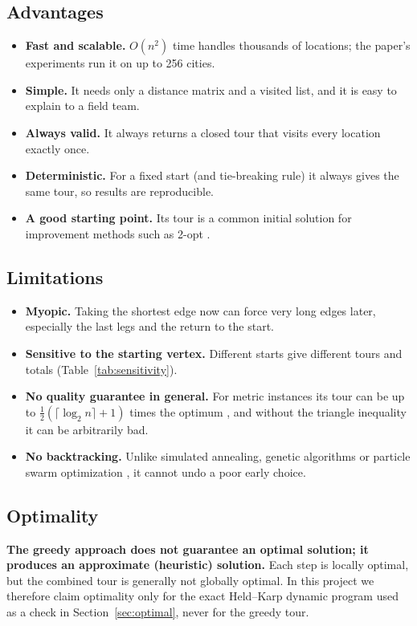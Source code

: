 \documentclass[11pt,a4paper]{article}
\begin{document}
\subsection{Advantages}
\begin{itemize}[noitemsep]
  \item \textbf{Fast and scalable.} $O(n^2)$ time handles thousands of locations; the paper's experiments run it on up to 256 cities.
  \item \textbf{Simple.} It needs only a distance matrix and a visited list, and it is easy to explain to a field team.
  \item \textbf{Always valid.} It always returns a closed tour that visits every location exactly once.
  \item \textbf{Deterministic.} For a fixed start (and tie-breaking rule) it always gives the same tour, so results are reproducible.
  \item \textbf{A good starting point.} Its tour is a common initial solution for improvement methods such as 2-opt \cite{croes1958}.
\end{itemize}

\subsection{Limitations}
\begin{itemize}[noitemsep]
  \item \textbf{Myopic.} Taking the shortest edge now can force very long edges later, especially the last legs and the return to the start.
  \item \textbf{Sensitive to the starting vertex.} Different starts give different tours and totals (Table~\ref{tab:sensitivity}).
  \item \textbf{No quality guarantee in general.} For metric instances its tour can be up to $\tfrac12(\lceil \log_2 n\rceil + 1)$ times the optimum \cite{rosenkrantz1977}, and without the triangle inequality it can be arbitrarily bad.
  \item \textbf{No backtracking.} Unlike simulated annealing, genetic algorithms or particle swarm optimization \cite{luna2024}, it cannot undo a poor early choice.
\end{itemize}

\subsection{Optimality}
\textbf{The greedy approach does not guarantee an optimal solution; it produces an approximate (heuristic) solution.} Each step is locally optimal, but the combined tour is generally not globally optimal. In this project we therefore claim optimality only for the exact Held--Karp dynamic program used as a check in Section~\ref{sec:optimal}, never for the greedy tour.
\end{document}
